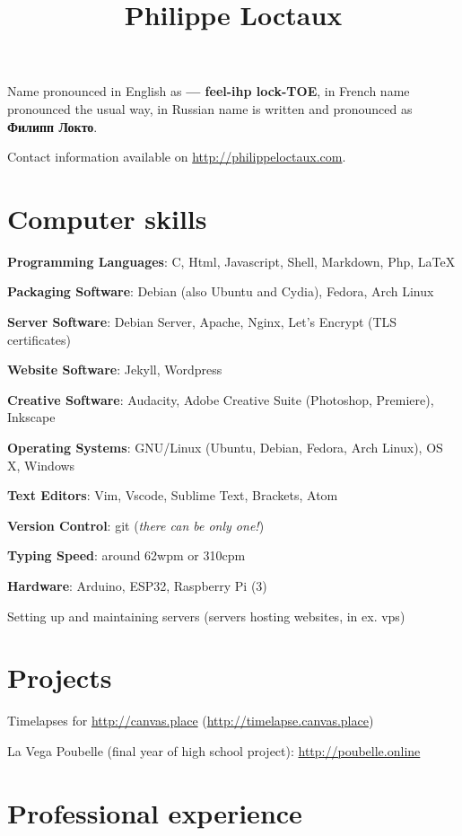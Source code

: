 \documentclass[a4paper]{article}
\title{Philippe Loctaux}
\date{\vspace{-5ex}}
\begin{document}
\maketitle

Name pronounced in English as \textbf{ — feel-ihp lock-TOE}, in French name pronounced the usual way, in Russian name is written and pronounced as \textbf{Филипп Локто}.

Contact information available on \url{http://philippeloctaux.com}.

\section*{Computer skills}

\textbf{Programming Languages}: C, Html, Javascript, Shell, Markdown, Php, \LaTeX

\textbf{Packaging Software}: Debian (also Ubuntu and Cydia), Fedora, Arch Linux

\textbf{Server Software}: Debian Server, Apache, Nginx, Let's Encrypt (TLS certificates)

\textbf{Website Software}: Jekyll, Wordpress

\textbf{Creative Software}: Audacity, Adobe Creative Suite (Photoshop, Premiere), Inkscape

\textbf{Operating Systems}: GNU/Linux (Ubuntu, Debian, Fedora, Arch Linux), OS X, Windows

\textbf{Text Editors}: Vim, Vscode, Sublime Text, Brackets, Atom

\textbf{Version Control}: git (\textit{there can be only one!})

\textbf{Typing Speed}: around 62wpm or 310cpm

\textbf{Hardware}: Arduino, ESP32, Raspberry Pi (3)

Setting up and maintaining servers (servers hosting websites, in ex. vps)

\section*{Projects}

Timelapses for \url{http://canvas.place} (\url{http://timelapse.canvas.place})

La Vega Poubelle (final year of high school project): \url{http://poubelle.online}

\section*{Professional experience}
\end{document}
